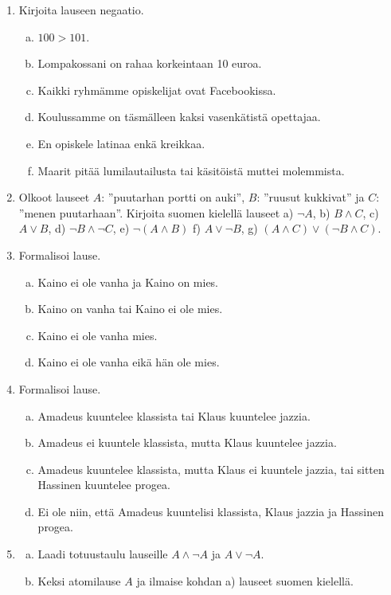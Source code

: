 \begin{enumerate}

\item  Kirjoita lauseen negaatio.
\begin{enumerate}[a)]
\item $100 > 101$.
\item Lompakossani on rahaa korkeintaan 10 euroa.
\item Kaikki ryhmämme opiskelijat ovat Facebookissa.
\item Koulussamme on täsmälleen kaksi vasenkätistä opettajaa.
\item En opiskele latinaa enkä kreikkaa.
\item Maarit pitää lumilautailusta tai käsitöistä muttei molemmista.
\end{enumerate}

\item Olkoot lauseet $A$: ''puutarhan portti on auki'', $B$: ''ruusut kukkivat'' ja $C$: ''menen puutarhaan''. Kirjoita suomen kielellä lauseet a) $\lnot A$,  b)  $B\land C$,  c)  $A\lor B$,
d) $\lnot B \land \lnot C$,  e)  $\lnot(A\land B)$  f)  $A \lor \lnot B$,   g)  $(A \land C) \lor (\lnot B \land C)$. 

\item Formalisoi lause.
\begin{enumerate}[a)]
\item Kaino ei ole vanha ja Kaino on mies.
\item Kaino on vanha tai Kaino ei ole mies.
\item Kaino ei ole vanha mies. 
\item Kaino ei ole vanha eikä hän ole mies.
\end{enumerate}

\item Formalisoi lause.
\begin{enumerate}[a)]
\item Amadeus kuuntelee klassista tai Klaus kuuntelee jazzia.
\item Amadeus ei kuuntele klassista, mutta Klaus kuuntelee jazzia.
\item Amadeus kuuntelee klassista, mutta Klaus ei kuuntele jazzia, tai sitten Hassinen kuuntelee progea.
\item Ei ole niin, että Amadeus kuuntelisi klassista, Klaus jazzia ja Hassinen progea.
\end{enumerate}

\item 
\begin{enumerate}[a)]
\item Laadi totuustaulu lauseille $A\land \lnot A$ ja $A\lor \lnot A$.
\item Keksi atomilause $A$ ja ilmaise kohdan a) lauseet suomen kielellä.
\end{enumerate}


\end{enumerate}
